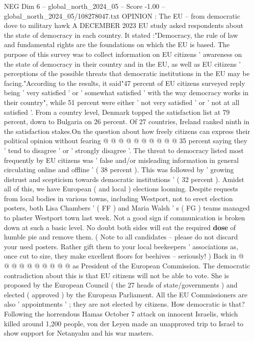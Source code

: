 \begin{textsample}{NEG Dim 6 – global\_north\_2024\_05 – Score -1.00 – global\_north\_2024\_05/108278047.txt}  \label{ex:f6_neg_297}
OPINION : The EU -- from democratic dove to military hawk A DECEMBER 2023 EU study asked respondents about the state of democracy in each country.
It stated :"Democracy, the rule of law and fundamental rights are the foundations on which the EU is based.
The purpose of this survey was to collect information on EU citizens ' awareness on the state of democracy in their country and in the EU, as well as EU citizens ' perceptions of the possible threats that democratic institutions in the EU may be facing."According to the results, it said"47 percent of EU citizens surveyed reply being ' very satisfied ' or ' somewhat satisfied ' with the way democracy works in their country", while 51 percent were either ' not very satisfied ' or ' not at all satisfied '.
From a country level, Denmark topped the satisfaction list at 79 percent, down to Bulgaria on 26 percent.
Of 27 countries, Ireland ranked ninth in the satisfaction stakes.On the question about how freely citizens can express their political opinion without fearing @ @ @ @ @ @ @ @ @ @ 35 percent saying they ' tend to disagree ' or ' strongly disagree '.
The threat to democracy listed most frequently by EU citizens was ' false and/or misleading information in general circulating online and offline ' ( 38 percent ).
This was followed by ' growing distrust and scepticism towards democratic institutions ' ( 32 percent ).
Amidst all of this, we have European ( and local ) elections looming.
Despite requests from local bodies in various towns, including Westport, not to erect election posters, both Lisa Chambers ' ( FF ) and Maria Walsh ' s ( FG ) teams managed to plaster Westport town last week.
Not a good sign if communication is broken down at such a basic level.
No doubt both sides will eat the required \textbf{dose} of humble pie and remove them. ( Note to all candidates -- please do not discard your used posters.
Rather gift them to your local beekeepers ' associations as, once cut to size, they make excellent floors for beehives -- seriously! ) Back in @ @ @ @ @ @ @ @ @ @ as President of the European Commission.
The democratic contradiction about this is that EU citizens will not be able to vote.
She is proposed by the European Council ( the 27 heads of state/governments ) and elected ( approved ) by the European Parliament.
All the EU Commissioners are also ' appointments ' ; they are not elected by citizens.
How democratic is that?
Following the horrendous Hamas October 7 attack on innocent Israelis, which killed around 1,200 people, von der Leyen made an unapproved trip to Israel to show support for Netanyahu and his war masters.

\end{textsample}
